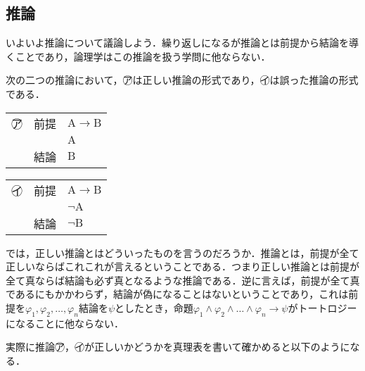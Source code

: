 \documentclass[10pt,b5paper,papersize,dvipdfmx]{jsbook}
\newcommand\rmA{\mathrm{A}}
\newcommand\rmB{\mathrm{B}}
\newcommand\maru[1]{\textcircled{\scriptsize{}#1}}
\begin{document}
\subsection{推論}
いよいよ推論について議論しよう．繰り返しになるが推論とは前提から結論を導くことであり，論理学はこの推論を扱う学問に他ならない．\par
次の二つの推論において，\maru{ア}は正しい推論の形式であり，\maru{イ}は誤った推論の形式である．
\begin{table}[H]
  \begin{minipage}[t]{.45\textwidth}
    \centering
    \begin{tabular}{lll}
      \maru{ア} & 前提 & $\rmA \to \rmB$ \\
                &     & $\rmA$ \\ \hline
                & 結論 & $\rmB$ \\
    \end{tabular}
  \end{minipage}
  \hfill
  \begin{minipage}[t]{.45\textwidth}
    \centering
    \begin{tabular}{lll}
      \maru{イ} & 前提 & $\rmA \to \rmB$ \\
                &     & $\lnot \rmA$ \\ \hline
                & 結論 & $\lnot \rmB$ \\
    \end{tabular}
  \end{minipage}
\end{table}
では，正しい推論とはどういったものを言うのだろうか．推論とは，前提が全て正しいならばこれこれが言えるということである．つまり正しい推論とは前提が全て真ならば結論も必ず真となるような推論である．逆に言えば，前提が全て真であるにもかかわらず，結論が偽になることはないということであり，これは前提を$\varphi_1,\varphi_2,\dots,\varphi_n$結論を$\psi$としたとき，命題$\varphi_1\land\varphi_2\land \dots \land\varphi_n\to\psi$がトートロジーになることに他ならない．\par
実際に推論\maru{ア}，\maru{イ}が正しいかどうかを真理表を書いて確かめると以下のようになる．
\end{document}
